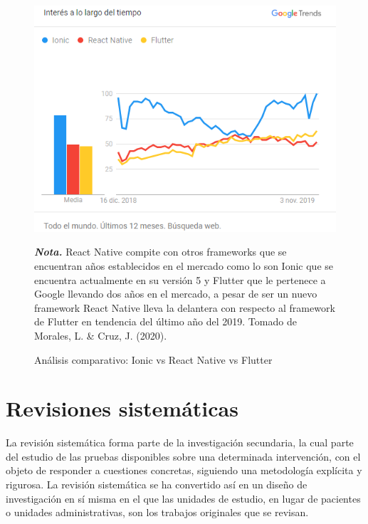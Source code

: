 \documentclass[12pt, a4paper, nofontenc, numbers=endperiod]{apa7}
\begin{document}
{	 
	\begin{figure}[h]
		\caption{Análisis comparativo: Ionic vs React Native vs Flutter}
		\label{Figura2} %
		\vspace*{0.1cm}
		\includegraphics[width=\textwidth]{Imagenes/Figura13}
			\begin{tablenotes}[para,flushleft]
			{\small
				\textit{\textbf{Nota.}} React Native compite con otros frameworks que se encuentran años establecidos en el mercado como lo son Ionic que se encuentra actualmente en su versión 5 y Flutter que le pertenece a Google llevando dos años en el mercado, a pesar de ser un nuevo framework React Native lleva la delantera con respecto al framework de Flutter en tendencia del último año del 2019. Tomado de Morales, L. \& Cruz, J. (2020).
			}
		\end{tablenotes}
	\end{figure}
	
\newpage	

\section{\normalsize  \centering Revisiones sistemáticas}
\vspace*{-0.2cm}

	\setlength{\parindent}{1.27cm}La revisión sistemática forma parte de la investigación secundaria, la cual parte del estudio de las pruebas disponibles sobre una determinada intervención, con el objeto de responder a cuestiones concretas, siguiendo una metodología explícita y rigurosa. La revisión sistemática se ha convertido así en un diseño de investigación en sí misma en el que las unidades de estudio, en lugar de pacientes o unidades administrativas, son los trabajos originales que se revisan.
	
}
\end{document}
